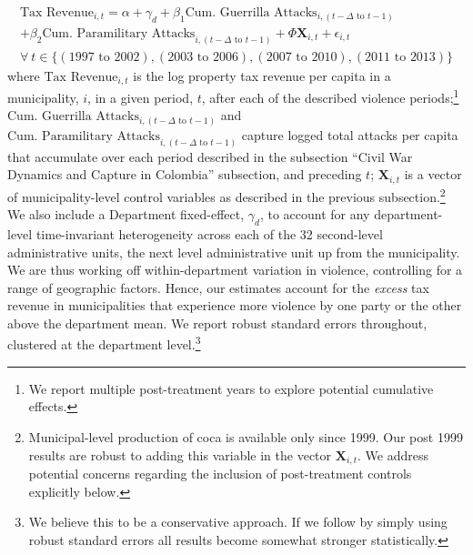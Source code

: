 		\begin{align}
			\label{eq:revenue}
			\mbox{Tax Revenue}_{i,t} = \alpha + \gamma_d+  \beta_1 \mbox{Cum. Guerrilla Attacks}_{i,(t-\Delta \text{ to } t-1)} \nonumber \\ 
			+ \beta_2 \mbox{Cum. Paramilitary Attacks}_{i,(t-\Delta \text{ to } t-1)} + \Phi \mathbf{X}_{i,t} + \epsilon_{i,t} \\ \forall \ t \in \{(1997 \text{ to } 2002), (2003 \text { to } 2006), (2007 \text { to } 2010), (2011 \text{ to } 2013) \nonumber \}
		\end{align}
\noindent where 	 	
 $\mbox{Tax Revenue}_{i,t}$ is the log property tax revenue per capita in a municipality, $i$, in a given period, $t$, after each of the described violence periods;\footnote{We report multiple post-treatment years to explore potential cumulative effects.} $ \mbox{Cum. Guerrilla Attacks}_{i,(t-\Delta \text{ to } t-1)}$ and $\mbox{Cum. Paramilitary Attacks}_{i,(t-\Delta \text{ to } t-1)}$ capture logged total attacks per capita that accumulate over each period described in the subsection ``Civil War Dynamics and Capture in Colombia'' subsection, and preceding $t$; $\mathbf{X}_{i,t}$ is a vector of municipality-level control variables as described in the previous subsection.\footnote{Municipal-level production of coca is available only since 1999. Our post 1999 results are robust to adding this variable in the vector $\mathbf{X}_{i,t}$. We address potential concerns regarding the inclusion of post-treatment controls explicitly below.} We also include a Department fixed-effect, $\gamma_d$, to account for any department-level time-invariant heterogeneity across each of the 32 second-level administrative units, the next level administrative unit up from the municipality. 
We are thus working off within-department variation in violence, controlling for a range of geographic factors. Hence, our estimates account for the {\it excess} tax revenue in municipalities that experience more violence by one party or the other above the department mean. We report robust standard errors throughout, clustered at the department level.\footnote{We believe this to be a conservative approach. If we follow \citet{acemoglurobinson13a} by simply using robust standard errors all results become somewhat stronger statistically.}

